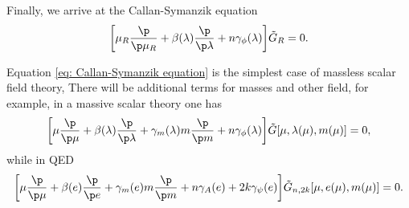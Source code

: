 Finally, we arrive at the Callan-Symanzik equation
\begin{equation}
\label{eq: Callan-Symanzik equation}
    \bigg[\mu_R\frac{\p}{\p\mu_R} + \beta(\lambda)\frac{\p}{\p\lambda} + n\gamma_\phi(\lambda)\bigg]\tilde{G}_R = 0.
\end{equation}
\begin{obs}
    Equation \eqref{eq: Callan-Symanzik equation} is the simplest case of massless scalar field theory, There will be additional terms for masses and other field, for example, in a massive scalar theory one has
    \begin{equation}
        \bigg[\mu\frac{\p}{\p\mu} + \beta(\lambda)\frac{\p}{\p\lambda} + \gamma_m(\lambda)m\frac{\p}{\p m} + n\gamma_\phi(\lambda)\bigg]\tilde{G}[\mu,\lambda(\mu),m(\mu)] = 0,
    \end{equation}
    while in QED 
    \begin{equation}
        \bigg[\mu\frac{\p}{\p\mu} + \beta(e)\frac{\p}{\p e} + \gamma_m(e)m\frac{\p}{\p m} + n\gamma_A(e) + 2k\gamma_\psi(e)\bigg]\tilde{G}_{n,2k}[\mu,e(\mu),m(\mu)] = 0.
    \end{equation}
\end{obs}

